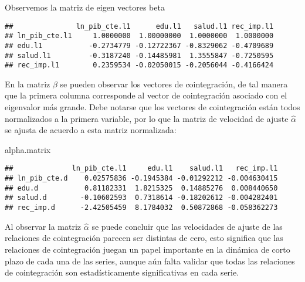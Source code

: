 \documentclass[]{book}
\newenvironment{Shaded}{\begin{snugshade}}{\end{snugshade}}
\newcommand{\KeywordTok}[1]{\textcolor[rgb]{0.13,0.29,0.53}{\textbf{#1}}}
\newcommand{\StringTok}[1]{\textcolor[rgb]{0.31,0.60,0.02}{#1}}
\newcommand{\OperatorTok}[1]{\textcolor[rgb]{0.81,0.36,0.00}{\textbf{#1}}}
\newcommand{\NormalTok}[1]{#1}
\theoremstyle{definition}
\theoremstyle{definition}
\theoremstyle{definition}
\theoremstyle{remark}
\begin{document}
Observemos la matriz de eigen vectores beta

\begin{Shaded}
\end{Shaded}

\begin{verbatim}
##               ln_pib_cte.l1      edu.l1   salud.l1 rec_imp.l1
## ln_pib_cte.l1     1.0000000  1.00000000  1.0000000  1.0000000
## edu.l1           -0.2734779 -0.12722367 -0.8329062 -0.4709689
## salud.l1         -0.3187240 -0.14485981  1.3555847 -0.7250595
## rec_imp.l1        0.2359534 -0.02050015 -0.2056044 -0.4166424
\end{verbatim}

En la matriz \(\beta\) se pueden observar los vectores de cointegración,
de tal manera que la primera columna corresponde al vector de
cointegración asociado con el eigenvalor más grande. Debe notarse que
los vectores de cointegración están todos normalizados a la primera
variable, por lo que la matriz de velocidad de ajuste \(\hat{\alpha}\)
se ajusta de acuerdo a esta matriz normalizada:

\begin{Shaded}
\begin{Highlighting}[]
\NormalTok{alpha.matrix}
\end{Highlighting}
\end{Shaded}

\begin{verbatim}
##              ln_pib_cte.l1     edu.l1    salud.l1   rec_imp.l1
## ln_pib_cte.d    0.02575836 -0.1945384 -0.01292212 -0.004630415
## edu.d           0.81182331  1.8215325  0.14885276  0.008440650
## salud.d        -0.10602593  0.7318614 -0.18202612 -0.004282401
## rec_imp.d      -2.42505459  8.1784032  0.50872868 -0.058362273
\end{verbatim}

Al observar la matriz \(\hat{\alpha}\) se puede concluir que las
velocidades de ajuste de las relaciones de cointegración parecen ser
distintas de cero, esto significa que las relaciones de cointegración
juegan un papel importante en la dinámica de corto plazo de cada una de
las series, aunque aún falta validar que todas las relaciones de
cointegración son estadísticamente significativas en cada serie.
\end{document}

